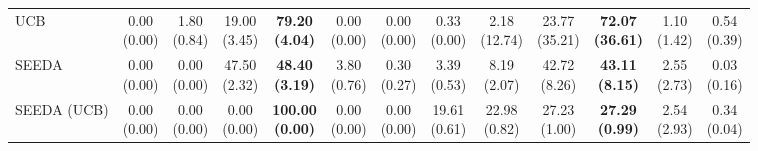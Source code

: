\begin{table}[H]
{\begin{tabular}{l|cccccc|cccccc}
UCB & \makecell{0.00 \\ (0.00)} & \makecell{1.80 \\ (0.84)} & {\cellcolor[HTML]{C8E6C9}} \makecell{19.00 \\ (3.45)} & \bfseries \makecell{79.20 \\ (4.04)} & \makecell{0.00 \\ (0.00)} & \makecell{0.00 \\ (0.00)} & \makecell{0.33 \\ (0.00)} & \makecell{2.18 \\ (12.74)} & {\cellcolor[HTML]{C8E6C9}} \makecell{23.77 \\ (35.21)} & \bfseries \makecell{72.07 \\ (36.61)} & \makecell{1.10 \\ (1.42)} & \makecell{0.54 \\ (0.39)} \\
SEEDA & \makecell{0.00 \\ (0.00)} & \makecell{0.00 \\ (0.00)} & {\cellcolor[HTML]{C8E6C9}} \makecell{47.50 \\ (2.32)} & \bfseries \makecell{48.40 \\ (3.19)} & \makecell{3.80 \\ (0.76)} & \makecell{0.30 \\ (0.27)} & \makecell{3.39 \\ (0.53)} & \makecell{8.19 \\ (2.07)} & {\cellcolor[HTML]{C8E6C9}} \makecell{42.72 \\ (8.26)} & \bfseries \makecell{43.11 \\ (8.15)} & \makecell{2.55 \\ (2.73)} & \makecell{0.03 \\ (0.16)} \\
SEEDA (UCB) & \makecell{0.00 \\ (0.00)} & \makecell{0.00 \\ (0.00)} & {\cellcolor[HTML]{C8E6C9}} \makecell{0.00 \\ (0.00)} & \bfseries \makecell{100.00 \\ (0.00)} & \makecell{0.00 \\ (0.00)} & \makecell{0.00 \\ (0.00)} & \makecell{19.61 \\ (0.61)} & \makecell{22.98 \\ (0.82)} & {\cellcolor[HTML]{C8E6C9}} \makecell{27.23 \\ (1.00)} & \bfseries \makecell{27.29 \\ (0.99)} & \makecell{2.54 \\ (2.93)} & \makecell{0.34 \\ (0.04)} \\

\end{tabular}}
\end{table}
